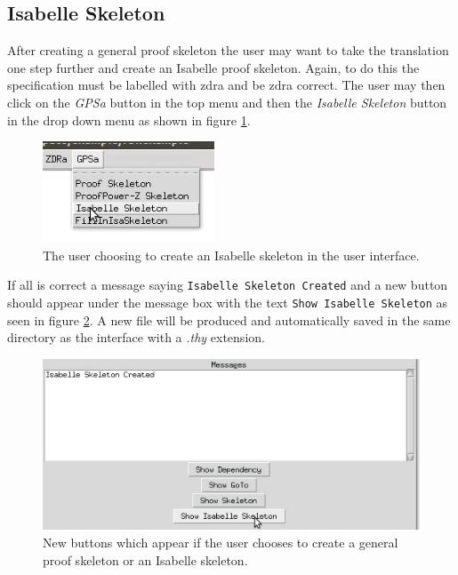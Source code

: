 \subsection{Isabelle Skeleton}

After creating a general proof skeleton the user may want to take the translation one step further and create an Isabelle proof skeleton. Again, to do this the specification must be labelled with \gls{zdra} and be \gls{zdra} correct. The user may then click on the \emph{GPSa} button in the top menu and then the \emph{Isabelle Skeleton} button in the drop down menu as shown in figure \ref{fig:converttoisa}.

\begin{figure}[H]
\centering
\includegraphics[scale=0.5]{Figures/Interface/isskeleton.png}
\caption{The user choosing to create an Isabelle skeleton in the user interface. \label{fig:converttoisa}}
\end{figure}

If all is correct a message saying \texttt{Isabelle Skeleton Created} and a new button should appear under the message box with the text \texttt{Show Isabelle Skeleton} as seen in figure \ref{fig:showskeleton}. A new file will be produced and automatically saved in the same directory as the interface with a \emph{.thy} extension.

\begin{figure}[H]
\centering
\includegraphics[scale=0.5]{Figures/Interface/showsaskeleton.png}
\caption{New buttons which appear if the user chooses to create a general proof skeleton or an Isabelle skeleton. \label{fig:showskeleton}}
\end{figure}

